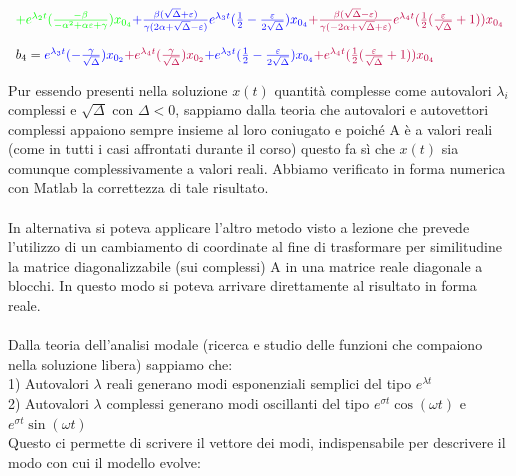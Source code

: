 \begin{tiny}
\begin{displaymath}
\begin{array}{l}
{\color{green}+}{\color{green}e^{\lambda_{2}t}(\frac{-\beta}{-\alpha^{2}+\alpha\varepsilon+\gamma})x_{0_{4}}}{\color{blue}+\frac{\beta(\sqrt{\Delta}+\varepsilon)}{\gamma(2\alpha+\sqrt{\Delta}-\varepsilon)}e^{\lambda_{3}t}(\frac{1}{2}-\frac{\varepsilon}{2\sqrt{\Delta}})x_{0_{4}}}{\color{purple}+\frac{\beta(\sqrt{\Delta}-\varepsilon)}{\gamma(-2\alpha+\sqrt{\Delta}+\varepsilon)}e^{\lambda_{4}t}(\frac{1}{2}(\frac{\varepsilon}{\sqrt{\Delta}}+1))x_{0_{4}}} \\ \\
b_{4}={\color{blue}e^{\lambda_{3}t}(-\frac{\gamma}{\sqrt{\Delta}})x_{0_{2}}}{\color{purple}+e^{\lambda_{4}t}(\frac{\gamma}{\sqrt{\Delta}})x_{0_{2}}}{\color{blue}+e^{\lambda_{3}t}(\frac{1}{2}-\frac{\varepsilon}{2\sqrt{\Delta}})x_{0_{4}}}{\color{purple}+e^{\lambda_{4}t}(\frac{1}{2}(\frac{\varepsilon}{\sqrt{\Delta}}+1))x_{0_{4}}} \\
\end{array}
\end{displaymath}
\end{tiny}
Pur essendo presenti nella soluzione $x(t)$ quantità complesse come autovalori $\lambda_{i}$ complessi e $\sqrt{\Delta}$ con $\Delta<0$, sappiamo dalla teoria che autovalori e autovettori complessi appaiono sempre insieme al loro coniugato e poiché A è a valori reali (come in tutti i casi affrontati durante il corso) questo fa sì che $x(t)$ sia comunque complessivamente a valori reali. 
Abbiamo verificato in forma numerica con Matlab la correttezza di tale risultato.
\\\\In alternativa si poteva applicare l'altro metodo visto a lezione che prevede l'utilizzo di un cambiamento di coordinate al fine di trasformare per similitudine la matrice diagonalizzabile (sui complessi) A in una matrice reale diagonale a blocchi. In questo modo si poteva arrivare direttamente al risultato in forma reale. \\
\\ Dalla teoria dell'analisi modale (ricerca e studio delle funzioni che compaiono nella soluzione libera) sappiamo che: \\
1) Autovalori $\lambda$ reali generano modi esponenziali semplici del tipo $e^{\lambda t}$ \\
2) Autovalori $\lambda$ complessi generano modi oscillanti del tipo $e^{\sigma t}\cos(\omega t)$ e $e^{\sigma t}\sin(\omega t)$\\
Questo ci permette di scrivere il vettore dei modi, indispensabile per descrivere il modo con cui il modello evolve:
